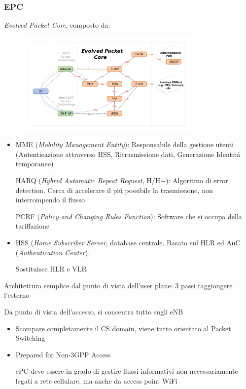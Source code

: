 \documentclass{article}
\begin{document}
\subsubsection{EPC}
\textit{Evolved Packet Core}, composto da:
\begin{figure}[h]
    \includegraphics[width=0.8\textwidth]{img/sdt/Evolved_Packet_Core}
    \centering
\end{figure}

\begin{itemize}
    \item MME (\textit{Mobility Management Entity}): Responsabile della gestione utenti (Autenticazione attraverso HSS, Ritrasmissione dati, Generazione Identit\'a temporanee)

        HARQ (\textit{Hybrid Automatic Repeat Request}, H/H+): Algoritmo di error detection, Cerca di accelerare il pi\'u possibile la trasmissione, non interrompendo il flusso

        PCRF (\textit{Policy and Changing Rules Function}): Software che si occupa della tariffazione
    \item HSS (\textit{Home Subscriber Server}, database centrale. Basato sul HLR ed AuC (\textit{Authentication Center}).

        Sostituisce HLR e VLR

\end{itemize}


Architettura semplice dal punto di vista dell'user plane: 3 passi raggiongere l'esterno

Da punto di vista dell'accesso, si concentra tutto sugli eNB


\begin{itemize}
    \item Scompare completamente il CS domain, viene tutto orientato al Packet Switching

    \item  Prepared for Non-3GPP Access

        ePC deve essere in grado di gestire flussi informativi non necessariamente legati a rete cellulare,
        ma anche da access point WiFi
\end{itemize}
\end{document}

